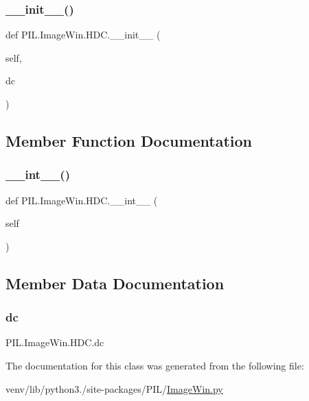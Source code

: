 \subsubsection{\texorpdfstring{\+\_\+\+\_\+init\+\_\+\+\_\+()}{\_\_init\_\_()}}
{\footnotesize\ttfamily def P\+I\+L.\+Image\+Win.\+H\+D\+C.\+\_\+\+\_\+init\+\_\+\+\_\+ (\begin{DoxyParamCaption}\item[{}]{self,  }\item[{}]{dc }\end{DoxyParamCaption})}



\subsection{Member Function Documentation}
\mbox{\label{classPIL_1_1ImageWin_1_1HDC_abd7a5bcf3eb7b3368aa4f7507da1a3c3}} 
\subsubsection{\texorpdfstring{\+\_\+\+\_\+int\+\_\+\+\_\+()}{\_\_int\_\_()}}
{\footnotesize\ttfamily def P\+I\+L.\+Image\+Win.\+H\+D\+C.\+\_\+\+\_\+int\+\_\+\+\_\+ (\begin{DoxyParamCaption}\item[{}]{self }\end{DoxyParamCaption})}



\subsection{Member Data Documentation}
\mbox{\label{classPIL_1_1ImageWin_1_1HDC_a0e44246db6ee59daf62e1a720ce93c22}} 
\subsubsection{\texorpdfstring{dc}{dc}}
{\footnotesize\ttfamily P\+I\+L.\+Image\+Win.\+H\+D\+C.\+dc}



The documentation for this class was generated from the following file\+:\begin{DoxyCompactItemize}
\item 
venv/lib/python3./site-\/packages/\+P\+I\+L/\hyperlink{ImageWin_8py}{Image\+Win.\+py}\end{DoxyCompactItemize}

